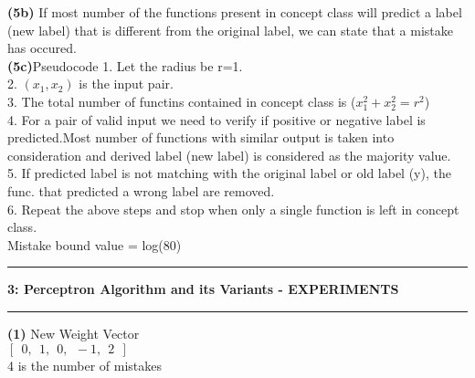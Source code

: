 \documentclass[11pt]{article}
\newcommand\question[2]{\vspace{.25in}\hrule\textbf{#1: #2}\vspace{.5em}\hrule\vspace{.10in}}
\renewcommand\part[1]{\vspace{.10in}\textbf{(#1)}}
\begin{document}
\part{5b} If most number of the functions present in concept class will predict a label (new label) that is different from the original label, we can state that a mistake has occured.\\
\part{5c}Pseudocode
1. Let the radius be r=1.
\\2. $(x_1,x_2)$ is the input pair.
\\3. The total number of functins contained in concept class is ($x_1^2+x_2^2=r^2$)
\\4. For a pair of valid input we need to verify if positive or negative label is predicted.Most number of functions with similar output is taken into consideration and derived label (new label) is considered as the majority value.
\\5. If predicted label is not matching with the original label or old label (y), the func. that predicted a wrong label are removed.
\\6. Repeat the above steps and stop when only a single function is left in concept class.
\\[10pt] Mistake bound value = log(80) 
\question{3}{Perceptron Algorithm and its Variants - EXPERIMENTS}
\part{1} New Weight Vector
\\$[\ \ 0, \ \ 1, \ \ 0, \ \ -1, \ \ 2 \ \ ]$
\\4 is the number of mistakes\\
\end{document}
